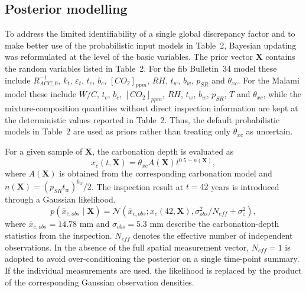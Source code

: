 \subsection{Posterior modelling}
\label{sec:posterior_modelling}

To address the limited identifiability of a single global discrepancy factor and to make better use of the probabilistic input models in Table~2, Bayesian updating was reformulated at the level of the basic variables. The prior vector $\boldsymbol{X}$ contains the random variables listed in Table~2. For the fib Bulletin~34 model these include $R^{-1}_{ACC,0}$, $k_t$, $\varepsilon_t$, $t_c$, $b_c$, $[CO_2]_{ppm}$, $RH$, $t_w$, $b_w$, $p_{SR}$ and $\theta_{xc}$. For the Malami model these include $W/C$, $t_c$, $b_c$, $[CO_2]_{ppm}$, $RH$, $t_w$, $b_w$, $p_{SR}$, $T$ and $\theta_{xc}$, while the mixture-composition quantities without direct inspection information are kept at the deterministic values reported in Table~2. Thus, the default probabilistic models in Table~2 are used as priors rather than treating only $\theta_{xc}$ as uncertain.

For a given sample of $\boldsymbol{X}$, the carbonation depth is evaluated as
\begin{equation}
    x_c(t,\boldsymbol{X}) = \theta_{xc} A(\boldsymbol{X})t^{0.5-n(\boldsymbol{X})},
\end{equation}
where $A(\boldsymbol{X})$ is obtained from the corresponding carbonation model and $n(\boldsymbol{X})=(p_{SR}t_w)^{b_w}/2$. The inspection result at $t=42$ years is introduced through a Gaussian likelihood,
\begin{equation}
    p(\bar{x}_{c,obs}\mid\boldsymbol{X}) =
    \mathcal{N}\left(\bar{x}_{c,obs};x_c(42,\boldsymbol{X}),\sigma_{obs}^2/N_{eff}+\sigma_\varepsilon^2\right),
\end{equation}
where $\bar{x}_{c,obs}=14.78$ mm and $\sigma_{obs}=5.3$ mm describe the carbonation-depth statistics from the inspection. $N_{eff}$ denotes the effective number of independent observations. In the absence of the full spatial measurement vector, $N_{eff}=1$ is adopted to avoid over-conditioning the posterior on a single time-point summary. If the individual measurements are used, the likelihood is replaced by the product of the corresponding Gaussian observation densities.

